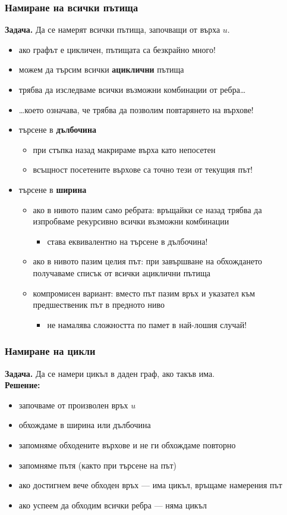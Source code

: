 \documentclass{beamer}
\begin{document}
\begin{frame}
  \frametitle{Намиране на всички пътища}
  \textbf{Задача. } Да се намерят всички пътища, започващи от върха $u$.\pause
  \begin{itemize}[<+->]
  \item ако графът е цикличен, пътищата са безкрайно много!
  \item можем да търсим всички \textbf{ациклични} пътища
  \item трябва да изследваме всички възможни комбинации от ребра\ldots
  \item \ldots което означава, че трябва да позволим повтарянето на върхове!
  \item търсене в \textbf{дълбочина}
    \begin{itemize}
    \item при стъпка назад макрираме върха като непосетен
    \item всъщност посетените върхове са точно тези от текущия път!
    \end{itemize}
  \item търсене в \textbf{ширина}
    \begin{itemize}
    \item ако в нивото пазим само ребрата: връщайки се назад трябва да изпробваме рекурсивно всички възможни комбинации
      \begin{itemize}
      \item става еквивалентно на търсене в дълбочина!
      \end{itemize}
    \item ако в нивото пазим целия път: при завършване на обхождането получаваме списък от всички ациклични пътища
    \item компромисен вариант: вместо път пазим връх и указател към предшественик път в предното ниво
      \begin{itemize}
      \item не намалява сложността по памет в най-лошия случай!
      \end{itemize}
    \end{itemize}
  \end{itemize}
\end{frame}

\begin{frame}
  \frametitle{Намиране на цикли}
  \textbf{Задача. }Да се намери цикъл в даден граф, ако такъв има.\\
  \pause
  \textbf{Решение:}\\
  \begin{itemize}[<+->]
  \item започваме от произволен връх $u$
  \item обхождаме в ширина или дълбочина
  \item запомняме обходените върхове и не ги обхождаме повторно
  \item запомняме пътя (както при търсене на път)
  \item ако достигнем вече обходен връх --- има цикъл, връщаме намерения път
  \item ако успеем да обходим всички ребра --- няма цикъл
  \end{itemize}
\end{frame}
\end{document}
